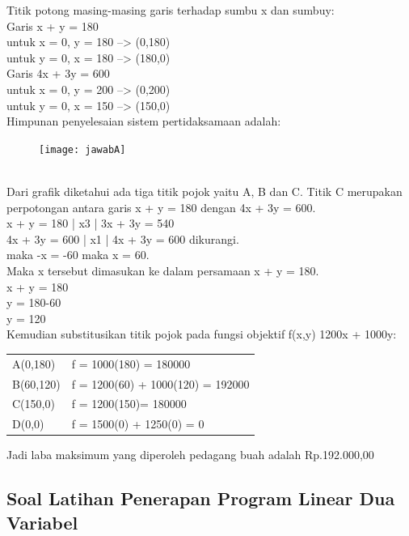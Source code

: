 \documentclass[11pt,fleqn]{book} %
\begin{document}
Titik potong masing-masing garis terhadap sumbu x dan sumbuy:\\
Garis x + y = 180\\
untuk x = 0, y = 180 --> (0,180)\\
untuk y = 0, x = 180 --> (180,0)\\

Garis 4x + 3y = 600\\
untuk x = 0, y = 200 --> (0,200)\\
untuk y = 0, x = 150 --> (150,0)\\

Himpunan penyelesaian sistem pertidaksamaan adalah:\\
\begin{figure}[h]
\centering\texttt{[image: jawabA]}
\end{figure}\\
Dari grafik diketahui ada tiga titik pojok yaitu A, B dan C. Titik C merupakan perpotongan antara garis x + y = 180 dengan 4x + 3y = 600.\\
x  +  y = 180 | x3 | 3x + 3y = 540\\
4x + 3y = 600 | x1 | 4x + 3y = 600 dikurangi.\\
maka -x = -60 maka x = 60.\\

Maka x tersebut dimasukan ke dalam persamaan x + y = 180.\\

x + y = 180\\
y = 180-60\\
y = 120\\

Kemudian substitusikan titik pojok pada fungsi objektif f(x,y) 1200x + 1000y:\\
\begin{tabular}{l l}
A(0,180) & f = 1000(180) = 180000 \\
B(60,120) & f = 1200(60) + 1000(120) = 192000 \\
C(150,0) & f = 1200(150)= 180000 \\
D(0,0) & f = 1500(0) + 1250(0) = 0 \\
\end{tabular}

Jadi laba maksimum yang diperoleh pedagang buah adalah Rp.192.000,00


\subsection{Soal Latihan Penerapan Program Linear Dua Variabel}
\end{document}
